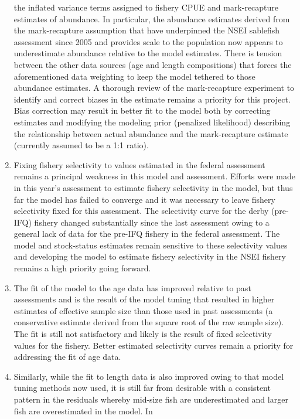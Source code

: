 \documentclass[
]{article}
\begin{document}
\begin{enumerate}
  the inflated variance terms assigned to fishery CPUE and
  mark-recapture estimates of abundance. In particular, the abundance
  estimates derived from the mark-recapture assumption that have
  underpinned the NSEI sablefish assessment since 2005 and provides
  scale to the population now appears to underestimate abundance
  relative to the model estimates. There is tension between the other
  data sources (age and length compositions) that forces the
  aforementioned data weighting to keep the model tethered to those
  abundance estimates. A thorough review of the mark-recapture
  experiment to identify and correct biases in the estimate remains a
  priority for this project. Bias correction may result in better fit to
  the model both by correcting estimates and modifying the modeling
  prior (penalized likelihood) describing the relationship between
  actual abundance and the mark-recapture estimate (currently assumed to
  be a 1:1 ratio).
\item
  Fixing fishery selectivity to values estimated in the federal
  assessment remains a principal weakness in this model and assessment.
  Efforts were made in this year's assessment to estimate fishery
  selectivity in the model, but thus far the model has failed to
  converge and it was necessary to leave fishery selectivity fixed for
  this assessment. The selectivity curve for the derby (pre-IFQ) fishery
  changed substantially since the last assessment owing to a general
  lack of data for the pre-IFQ fishery in the federal assessment. The
  model and stock-status estimates remain sensitive to these selectivity
  values and developing the model to estimate fishery selectivity in the
  NSEI fishery remains a high priority going forward.
\item
  The fit of the model to the age data has improved relative to past
  assessments and is the result of the model tuning that resulted in
  higher estimates of effective sample size than those used in past
  assessments (a conservative estimate derived from the square root of
  the raw sample size). The fit is still not satisfactory and likely is
  the result of fixed selectivity values for the fishery. Better
  estimated selectivity curves remain a priority for addressing the fit
  of age data.
\item
  Similarly, while the fit to length data is also improved owing to that
  model tuning methods now used, it is still far from desirable with a
  consistent pattern in the residuals whereby mid-size fish are
  underestimated and larger fish are overestimated in the model. In

\end{enumerate}
\end{document}
